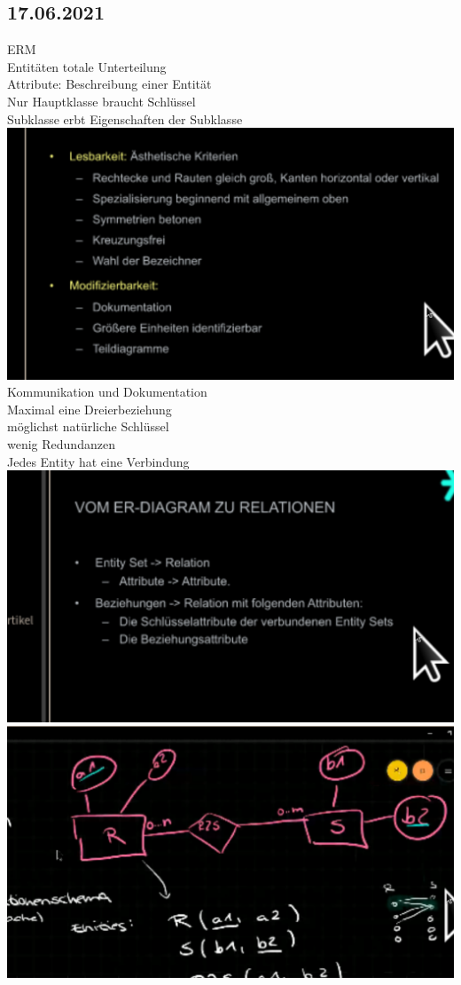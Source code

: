 \documentclass{article}
\begin{document}
	\subsection*{17.06.2021}
	ERM \\
	Entitäten totale Unterteilung \\
	Attribute: Beschreibung einer Entität \\
	Nur Hauptklasse braucht Schlüssel \\
	Subklasse erbt Eigenschaften der Subklasse \\
	\includegraphics[width=\linewidth]{erq} \\
	Kommunikation und Dokumentation  \\
	Maximal eine Dreierbeziehung \\
	möglichst natürliche Schlüssel \\
	wenig Redundanzen \\
	Jedes Entity hat eine Verbindung \\
	\includegraphics[width=\linewidth]{etr} \\
	\includegraphics[width=\linewidth]{etr2} \\
\end{document}
